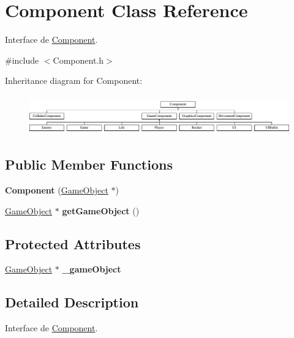 \hypertarget{class_component}{}\section{Component Class Reference}
\label{class_component}


Interface de \hyperlink{class_component}{Component}.  




{\ttfamily \#include $<$Component.\+h$>$}

Inheritance diagram for Component\+:\begin{figure}[H]
\begin{center}
\leavevmode
\includegraphics[height=1.702128cm]{class_component}
\end{center}
\end{figure}
\subsection*{Public Member Functions}
\begin{DoxyCompactItemize}
\item 
\hypertarget{class_component_a3d2ef69dcd0e27152de94fc7bb4f01de}{}\label{class_component_a3d2ef69dcd0e27152de94fc7bb4f01de} 
{\bfseries Component} (\hyperlink{class_game_object}{Game\+Object} $\ast$)
\item 
\hypertarget{class_component_a9c76099b7507595bc7f2eeecec3f9828}{}\label{class_component_a9c76099b7507595bc7f2eeecec3f9828} 
\hyperlink{class_game_object}{Game\+Object} $\ast$ {\bfseries get\+Game\+Object} ()
\end{DoxyCompactItemize}
\subsection*{Protected Attributes}
\begin{DoxyCompactItemize}
\item 
\hypertarget{class_component_ac52c4a811c3f8b64f3cd3306da81fba5}{}\label{class_component_ac52c4a811c3f8b64f3cd3306da81fba5} 
\hyperlink{class_game_object}{Game\+Object} $\ast$ {\bfseries \+\_\+game\+Object}
\end{DoxyCompactItemize}


\subsection{Detailed Description}
Interface de \hyperlink{class_component}{Component}. 

